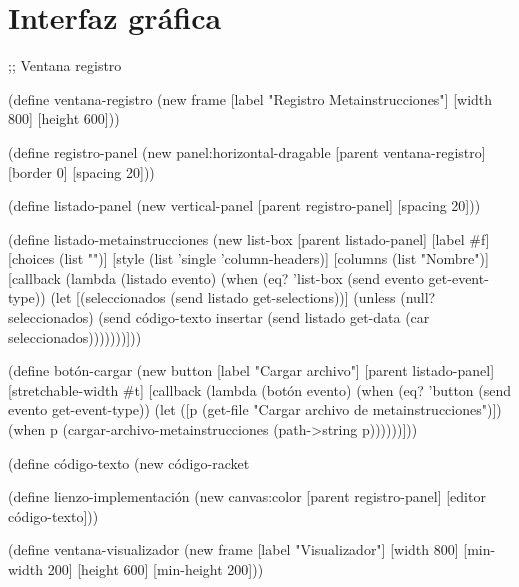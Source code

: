 \documentclass[10pt,oneside,openany,letterpaper]{book}
\begin{document}
\section{Interfaz gráfica}


\nwenddocs{}\endmoddef
;; Ventana registro

(define ventana-registro
  (new frame%
       [label "Registro Metainstrucciones"]
       [width 800]
       [height 600]))

(define registro-panel
  (new panel:horizontal-dragable%
       [parent ventana-registro]
       [border 0]
       [spacing 20]))

(define listado-panel
  (new vertical-panel%
       [parent registro-panel]
       [spacing 20]))

(define listado-metainstrucciones
  (new list-box%
       [parent listado-panel]
       [label #f]
       [choices (list "")]
       [style (list 'single
                    'column-headers)]
       [columns (list "Nombre")]
       [callback
        (lambda (listado evento)
          (when (eq? 'list-box (send evento get-event-type))
            (let [(seleccionados (send listado get-selections))]
              (unless (null? seleccionados)
                (send código-texto insertar
                      (send listado get-data (car seleccionados)))))))]))

(define botón-cargar (new button%
                          [label "Cargar archivo"]
                          [parent listado-panel]
                          [stretchable-width #t]
                          [callback
                           (lambda (botón evento)
                             (when (eq? 'button (send evento get-event-type))
                               (let ([p (get-file "Cargar archivo de metainstrucciones")])
                                 (when p
                                   (cargar-archivo-metainstrucciones (path->string p))))))]))

(define código-texto (new código-racket%

(define lienzo-implementación (new canvas:color%
                                   [parent registro-panel]
                                   [editor código-texto]))

(define ventana-visualizador
  (new frame%
       [label "Visualizador"]
       [width 800]  [min-width 200]
       [height 600] [min-height 200]))
\end{document}
